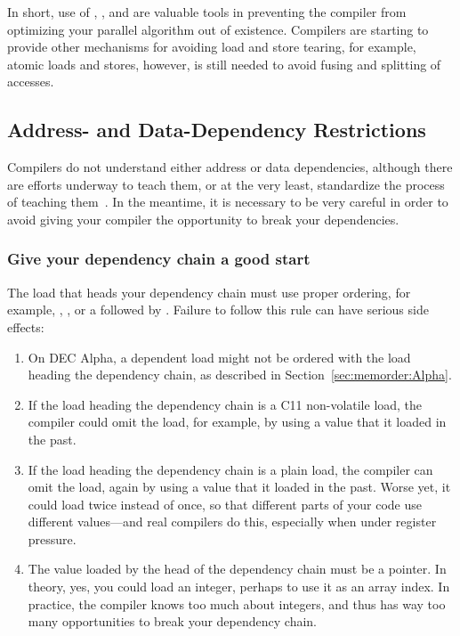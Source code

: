 In short, use of , , and
 are valuable tools in preventing the compiler from
optimizing your parallel algorithm out of existence.
Compilers are starting to provide other mechanisms for avoiding
load and store tearing, for example, 
atomic loads and stores, however,  is still needed
to avoid fusing and splitting of accesses.

\subsection{Address- and Data-Dependency Restrictions}
\label{sec:memorder:Address- and Data-Dependency Restrictions}

Compilers do not understand either address or data dependencies,
although there are efforts underway to teach them, or at the very
least, standardize the process of teaching
them~\cite{PaulEMcKennneyConsumeP0190R0,PaulEMcKenney2017markconsumeP0462R1}.
In the meantime, it is necessary to be very careful in order to avoid
giving your compiler the opportunity to break your dependencies.

\subsubsection{Give your dependency chain a good start}
The load that heads your dependency chain must use proper
ordering, for example, ,
, or
a  followed by .
Failure to follow this rule can have serious side effects:

\begin{enumerate}
\item	On DEC Alpha, a dependent load might not be ordered with
	the load heading the dependency chain, as described in
	Section~\ref{sec:memorder:Alpha}.
\item	If the load heading the dependency chain is a
	C11 non-volatile  load,
	the compiler could omit the load, for example, by using a value
	that it loaded in the past.
\item	If the load heading the dependency chain is a plain load,
	the compiler can omit the load, again by using a value
	that it loaded in the past.
	Worse yet, it could load twice instead of once, so that
	different parts of your code use different values---and
	real compilers do this, especially when under register
	pressure.
\item	The value loaded by the head of the dependency chain must
	be a pointer.
	In theory, yes, you could load an integer, perhaps to use
	it as an array index.
	In practice, the compiler knows too much about integers,
	and thus has way too many opportunities to break your
	dependency chain.
\end{enumerate}

